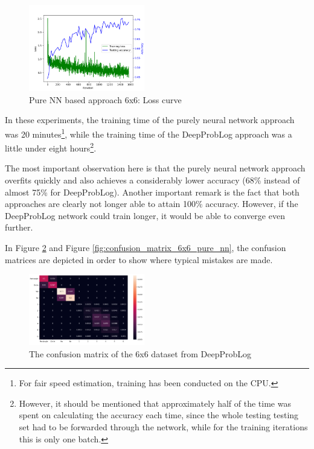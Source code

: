 \documentclass[english]{sobraep}
\begin{document}
\begin{figure}[htp]
    \begin{center}
    \includegraphics[width=0.45\textwidth]{loss_curve_pure_NN_6x6.png} 
    \captionsetup{justification=centering}
    \caption{Pure NN based approach 6x6: Loss curve}
    \label{fig:loss_curve_pure_NN_6x6}
    \end{center}
\end{figure}

In these experiments, the training time of the purely neural network approach was 20 minutes\footnote{For fair speed estimation, training has been conducted on the CPU.}, while the training time of the DeepProbLog approach was a little under eight hours\footnote{However, it should be mentioned that approximately half of the time was spent on calculating the accuracy each time, since the whole testing testing set had to be forwarded through the network, while for the training iterations this is only one batch.}.

The most important observation here is that the purely neural network approach overfits quickly and also achieves a considerably lower accuracy (68\% instead of almost 75\% for DeepProbLog). Another important remark is the fact that both approaches are clearly not longer able to attain 100\% accuracy. However, if the DeepProbLog network could train longer, it would be able to converge even further.

In Figure \ref{fig:confusion_matrix_6x6_deepproblog} and Figure \ref{fig:confusion_matrix_6x6_pure_nn}, the confusion matrices are depicted in order to show where typical mistakes are made.

\begin{figure}[htp]
    \begin{center}
    \includegraphics[width=0.45\textwidth]{confusion_matrix_6x6_deepproblog.png} 
    \captionsetup{justification=centering}
    \caption{The confusion matrix of the 6x6 dataset from DeepProbLog}
    \label{fig:confusion_matrix_6x6_deepproblog}
    \end{center}
\end{figure}
\end{document}
